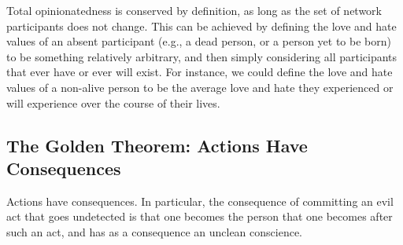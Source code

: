 \documentclass{article}
\begin{document}
Total opinionatedness is conserved by definition, as long as the set
of network participants does not change. This can be achieved by
defining the love and hate values of an absent participant (e.g., a
dead person, or a person yet to be born) to be something relatively
arbitrary, and then simply considering all participants that ever have
or ever will exist. For instance, we could define the love and hate
values of a non-alive person to be the average love and hate they
experienced or will experience over the course of their lives.

\subsection{The Golden Theorem: Actions Have Consequences} 

\begin{thm}
  Actions have consequences. In particular, the consequence of
  committing an evil act that goes undetected is that one becomes the
  person that one becomes after such an act, and has as a consequence
  an unclean conscience.
\end{thm}
\end{document}
